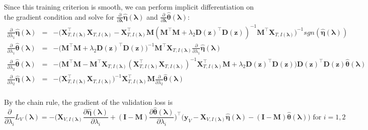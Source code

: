 \documentclass[10pt,letterpaper]{article}
\begin{document}
Since this training criterion is smooth, we can perform implicit differentiation on the gradient condition and solve for $\frac{\partial}{\partial \boldsymbol \lambda} \hat{\boldsymbol\eta}(\boldsymbol{\lambda}) $ and $\frac{\partial}{\partial \boldsymbol \lambda} \hat{\boldsymbol\theta}(\boldsymbol{\lambda}) $: 
\begin{equation*}
\begin{array}{lcl}
\frac{\partial}{\partial \lambda_1} \hat{\boldsymbol\eta}(\boldsymbol{\lambda})  &=&
-\bigg(\boldsymbol{X}_{T, I(\boldsymbol\lambda)}^\top \boldsymbol{X}_{T, I(\boldsymbol\lambda)}
- \boldsymbol{X}_{T, I(\boldsymbol\lambda)}^\top \boldsymbol{M}(\boldsymbol{M}^\top \boldsymbol{M}
+ \lambda_2 \boldsymbol{D}(\boldsymbol{z})^\top\boldsymbol{D}(\boldsymbol{z}))^{-1} \boldsymbol{M}^\top \boldsymbol{X}_{T, I(\boldsymbol\lambda)} \bigg)^{-1} 
sgn( \hat{\boldsymbol\eta}(\boldsymbol{\lambda})) \\
\frac{\partial }{\partial \lambda_1} \hat{\boldsymbol\theta}(\boldsymbol{\lambda}) &=&
-\bigg(\boldsymbol{M}^\top \boldsymbol{M}
+ \lambda_2 \boldsymbol{D}(\boldsymbol{z})^\top \boldsymbol{D}(\boldsymbol{z})\bigg)^{-1}
\boldsymbol{M}^\top \boldsymbol{X}_{T, I(\boldsymbol\lambda)} \frac{\partial}{\partial \lambda_1} \hat{\boldsymbol\eta}(\boldsymbol{\lambda})
\\
\frac{\partial}{\partial \lambda_2}  \hat{\boldsymbol\theta}(\boldsymbol{\lambda}) &=&
-\bigg(\boldsymbol{M}^\top \boldsymbol{M}
- \boldsymbol{M}^\top \boldsymbol{X}_{T, I(\boldsymbol\lambda)} (\boldsymbol{X}_{T, I(\boldsymbol\lambda)}^\top\boldsymbol{X}_{T, I(\boldsymbol\lambda)})^{-1} \boldsymbol{X}_{T, I(\boldsymbol\lambda)}^\top \boldsymbol{M} + \lambda_2 \boldsymbol{D}(\boldsymbol{z})^\top\boldsymbol{D}(\boldsymbol{z}) \bigg)
\boldsymbol{D}(\boldsymbol{z})^\top\boldsymbol{D}(\boldsymbol{z}) \hat{\boldsymbol\theta}(\boldsymbol{\lambda})
\\
\frac{\partial}{\partial \lambda_2} \hat{\boldsymbol\eta}(\boldsymbol{\lambda}) &=&
- \bigg( \boldsymbol{X}_{T, I(\boldsymbol\lambda)}^\top\boldsymbol{X}_{T, I(\boldsymbol\lambda)}\bigg)^{-1}
\boldsymbol{X}_{T, I(\boldsymbol\lambda)}^\top \boldsymbol{M}
\frac{\partial}{\partial \lambda_2}  \hat{\boldsymbol\theta}(\boldsymbol{\lambda})\\
\end{array}
\end{equation*}

By the chain rule, the gradient of the validation loss is
\begin{equation*}
\frac{\partial}{\partial \lambda_i} L_V(\boldsymbol{\lambda}) =
- \bigg(
\boldsymbol{X}_{V, I(\boldsymbol\lambda)} \frac{\partial \hat{\boldsymbol\eta}(\boldsymbol{\lambda})}{\partial \lambda_i}
+ (\boldsymbol I - \boldsymbol{M}) \frac{\partial \hat{\boldsymbol\theta}(\boldsymbol{\lambda})}{\partial \lambda_i}
\bigg )^\top
\bigg (
\boldsymbol{y}_V
- \boldsymbol{X}_{V, I(\boldsymbol\lambda)} \hat{\boldsymbol\eta}(\boldsymbol{\lambda})
- (\boldsymbol I - \boldsymbol{M}) \hat{\boldsymbol\theta}(\boldsymbol{\lambda})
\bigg )
\text{ for } i = 1,2 
\end{equation*}
\end{document}
